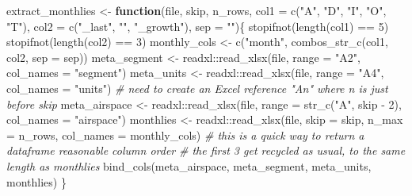 \documentclass[
]{book}
\newenvironment{Shaded}{\begin{snugshade}}{\end{snugshade}}
\newcommand{\AttributeTok}[1]{\textcolor[rgb]{0.77,0.63,0.00}{#1}}
\newcommand{\CommentTok}[1]{\textcolor[rgb]{0.56,0.35,0.01}{\textit{#1}}}
\newcommand{\ControlFlowTok}[1]{\textcolor[rgb]{0.13,0.29,0.53}{\textbf{#1}}}
\newcommand{\DecValTok}[1]{\textcolor[rgb]{0.00,0.00,0.81}{#1}}
\newcommand{\FunctionTok}[1]{\textcolor[rgb]{0.00,0.00,0.00}{#1}}
\newcommand{\NormalTok}[1]{#1}
\newcommand{\OtherTok}[1]{\textcolor[rgb]{0.56,0.35,0.01}{#1}}
\newcommand{\SpecialCharTok}[1]{\textcolor[rgb]{0.00,0.00,0.00}{#1}}
\newcommand{\StringTok}[1]{\textcolor[rgb]{0.31,0.60,0.02}{#1}}
\begin{document}
\begin{Shaded}
\begin{Highlighting}[]
\NormalTok{extract\_monthlies }\OtherTok{\textless{}{-}} \ControlFlowTok{function}\NormalTok{(file, skip, n\_rows,}
                              \AttributeTok{col1 =} \FunctionTok{c}\NormalTok{(}\StringTok{"A"}\NormalTok{, }\StringTok{"D"}\NormalTok{, }\StringTok{"I"}\NormalTok{, }\StringTok{"O"}\NormalTok{, }\StringTok{"T"}\NormalTok{),}
                              \AttributeTok{col2 =} \FunctionTok{c}\NormalTok{(}\StringTok{"\_last"}\NormalTok{, }\StringTok{""}\NormalTok{, }\StringTok{"\_growth"}\NormalTok{),}
                              \AttributeTok{sep =} \StringTok{""}\NormalTok{)\{}
  \FunctionTok{stopifnot}\NormalTok{(}\FunctionTok{length}\NormalTok{(col1) }\SpecialCharTok{==} \DecValTok{5}\NormalTok{)}
  \FunctionTok{stopifnot}\NormalTok{(}\FunctionTok{length}\NormalTok{(col2) }\SpecialCharTok{==} \DecValTok{3}\NormalTok{)}
\NormalTok{  monthly\_cols }\OtherTok{\textless{}{-}} \FunctionTok{c}\NormalTok{(}\StringTok{"month"}\NormalTok{, }
                    \FunctionTok{combos\_str\_c}\NormalTok{(col1, col2, }\AttributeTok{sep =}\NormalTok{ sep))}
\NormalTok{  meta\_segment }\OtherTok{\textless{}{-}}\NormalTok{ readxl}\SpecialCharTok{::}\FunctionTok{read\_xlsx}\NormalTok{(file, }\AttributeTok{range =} \StringTok{"A2"}\NormalTok{, }
                                    \AttributeTok{col\_names =} \StringTok{"segment"}\NormalTok{) }
\NormalTok{  meta\_units }\OtherTok{\textless{}{-}}\NormalTok{ readxl}\SpecialCharTok{::}\FunctionTok{read\_xlsx}\NormalTok{(file, }\AttributeTok{range =} \StringTok{"A4"}\NormalTok{, }
                                  \AttributeTok{col\_names =} \StringTok{"units"}\NormalTok{)}
  \CommentTok{\# need to create an Excel reference "An" where n is just before skip}
\NormalTok{  meta\_airspace }\OtherTok{\textless{}{-}}\NormalTok{ readxl}\SpecialCharTok{::}\FunctionTok{read\_xlsx}\NormalTok{(file, }\AttributeTok{range =} \FunctionTok{str\_c}\NormalTok{(}\StringTok{"A"}\NormalTok{, skip }\SpecialCharTok{{-}} \DecValTok{2}\NormalTok{), }
                                     \AttributeTok{col\_names =} \StringTok{"airspace"}\NormalTok{)}
\NormalTok{  monthlies }\OtherTok{\textless{}{-}}\NormalTok{ readxl}\SpecialCharTok{::}\FunctionTok{read\_xlsx}\NormalTok{(file, }\AttributeTok{skip =}\NormalTok{ skip, }\AttributeTok{n\_max =}\NormalTok{ n\_rows, }
                                 \AttributeTok{col\_names =}\NormalTok{ monthly\_cols) }
  \CommentTok{\# this is a quick way to return a dataframe reasonable column order}
  \CommentTok{\# the first 3 get recycled as usual, to the same length as monthlies}
  \FunctionTok{bind\_cols}\NormalTok{(meta\_airspace, meta\_segment, meta\_units, monthlies)}
\NormalTok{\}}


\end{Highlighting}
\end{Shaded}
\end{document}
